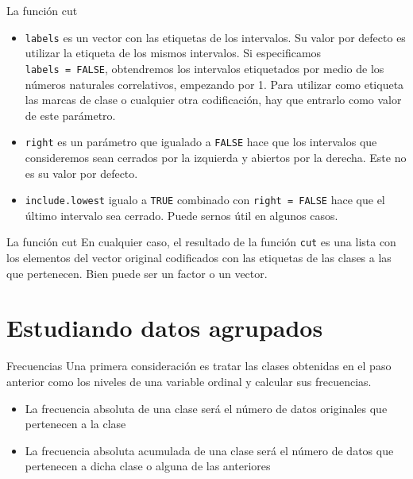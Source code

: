 \documentclass[
  ignorenonframetext,
  aspectratio=169]{beamer}
\providecommand{\tightlist}{%
  \setlength{\itemsep}{0pt}\setlength{\parskip}{0pt}}
\begin{document}
\begin{frame}[fragile]{La función cut}
\protect\hypertarget{la-funciuxf3n-cut-1}{}
\begin{itemize}
\tightlist
\item
  \texttt{labels} es un vector con las etiquetas de los intervalos. Su
  valor por defecto es utilizar la etiqueta de los mismos intervalos. Si
  especificamos \texttt{labels\ =\ FALSE}, obtendremos los intervalos
  etiquetados por medio de los números naturales correlativos, empezando
  por 1. Para utilizar como etiqueta las marcas de clase o cualquier
  otra codificación, hay que entrarlo como valor de este parámetro.
\item
  \texttt{right} es un parámetro que igualado a \texttt{FALSE} hace que
  los intervalos que consideremos sean cerrados por la izquierda y
  abiertos por la derecha. Este no es su valor por defecto.
\item
  \texttt{include.lowest} igualo a \texttt{TRUE} combinado con
  \texttt{right\ =\ FALSE} hace que el último intervalo sea cerrado.
  Puede sernos útil en algunos casos.
\end{itemize}
\end{frame}

\begin{frame}[fragile]{La función cut}
\protect\hypertarget{la-funciuxf3n-cut-2}{}
En cualquier caso, el resultado de la función \texttt{cut} es una lista
con los elementos del vector original codificados con las etiquetas de
las clases a las que pertenecen. Bien puede ser un factor o un vector.
\end{frame}

\hypertarget{estudiando-datos-agrupados}{%
\section{Estudiando datos agrupados}\label{estudiando-datos-agrupados}}

\begin{frame}{Frecuencias}
\protect\hypertarget{frecuencias}{}
Una primera consideración es tratar las clases obtenidas en el paso
anterior como los niveles de una variable ordinal y calcular sus
frecuencias.

\begin{itemize}
\tightlist
\item
  La frecuencia absoluta de una clase será el número de datos originales
  que pertenecen a la clase
\item
  La frecuencia absoluta acumulada de una clase será el número de datos
  que pertenecen a dicha clase o alguna de las anteriores
\end{itemize}
\end{frame}
\end{document}
